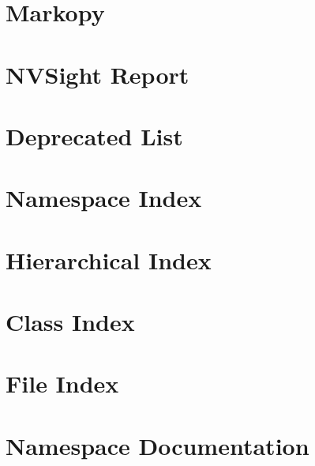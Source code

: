 \let\mypdfximage\pdfximage\def\pdfximage{\immediate\mypdfximage}\documentclass[twoside]{book}
\newcommand{\+}{\discretionary{\mbox{\scriptsize$\hookleftarrow$}}{}{}}
\begin{document}
\chapter{Markopy}
\label{index}\hypertarget{index}{}
\chapter{N\+V\+Sight Report}
\label{md__media_ignis__h_d_d__repositories__markov_passwords__n_v_sight_report}

\chapter{Deprecated List}
\label{deprecated}

\chapter{Namespace Index}

\chapter{Hierarchical Index}

\chapter{Class Index}

\chapter{File Index}

\chapter{Namespace Documentation}



















\end{document}
